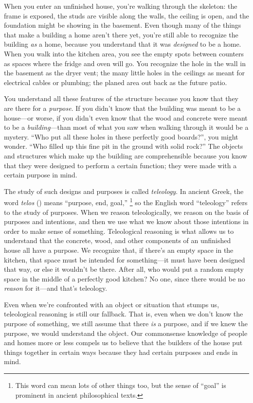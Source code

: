 		When you enter an unfinished house, you're walking through the skeleton: the frame is exposed, the studs are visible along the walls, the ceiling is open, and the foundation might be showing in the basement. Even though many of the things that make a building a home aren't there yet, you're still able to recognize the building \textit{as} a home, because you understand that it was \textit{designed} to be a home. When you walk into the kitchen area, you see the empty spots between counters as spaces where the fridge and oven will go. You recognize the hole in the wall in the basement as the dryer vent; the many little holes in the ceilings as meant for electrical cables or plumbing; the planed area out back as the future patio.
		
		You understand all these features of the structure because you know that they are there for a \textit{purpose}. If you didn't know that the building was meant to be a house---or worse, if you didn't even know that the wood and concrete were meant to be a \textit{building}---than most of what you saw when walking through it would be a mystery. ``Who put all these holes in these perfectly good boards?'', you might wonder. ``Who filled up this fine pit in the ground with solid rock?'' The objects and structures which make up the building are comprehensible because you know that they were designed to perform a certain function; they were made with a certain purpose in mind.
		
		The study of such designs and purposes is called \textit{teleology}. In ancient Greek, the word \textit{telos} () means ``purpose, end, goal,''%
			\footnote{This word can mean lots of other things too, but the sense of ``goal'' is prominent in ancient philosophical texts.}
		so the English word ``teleology'' refers to the study of purposes. When we reason teleologically, we reason on the basis of purposes and intentions, and then we use what we know about those intentions in order to make sense of something. Teleological reasoning is what allows us to understand that the concrete, wood, and other components of an unfinished house all have a purpose. We recognize that, if there's an empty space in the kitchen, that space must be intended for something---it must have been designed that way, or else it wouldn't be there. After all, who would put a random empty space in the middle of a perfectly good kitchen? No one, since there would be no \textit{reason} for it---and that's teleology.
		
		Even when we're confronted with an object or situation that stumps us, teleological reasoning is still our fallback. That is, even when we don't know the purpose of something, we still assume that there \textit{is} a purpose, and if we knew the purpose, we would understand the object. Our commonsense knowledge of people and homes more or less compels us to believe that the builders of the house put things together in certain ways because they had certain purposes and ends in mind.
		
